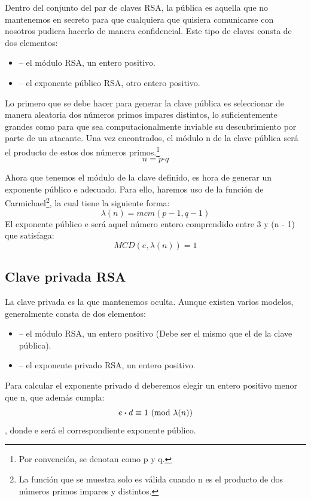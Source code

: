 Dentro del conjunto del par de claves RSA, la pública es aquella que no mantenemos en secreto para que cualquiera que quisiera comunicarse con nosotros pudiera hacerlo de manera confidencial. Este tipo de claves consta de dos elementos:
\begin{itemize}
  \item {} -- el módulo RSA, un entero positivo.
  \item {} -- el exponente público RSA, otro entero positivo.
\end{itemize}

Lo primero que se debe hacer para generar la clave pública es seleccionar de manera aleatoria dos números primos impares distintos, lo suficientemente grandes como para que sea computacionalmente inviable su descubrimiento por parte de un atacante. Una vez encontrados, el módulo n de la clave pública será el producto de estos dos números primos.\footnote{Por convención, se denotan como p y q.}
\[ n = p \boldsymbol{\cdot} q \]

Ahora que tenemos el módulo de la clave definido, es hora de generar un exponente público e adecuado. Para ello, haremos uso de la función de Carmichael\footnote{La función que se muestra solo es válida cuando n es el producto de dos números primos impares y distintos.}, la cual tiene la siguiente forma:
\[ \lambda(n) = mcm(p - 1, q - 1) \]
El exponente público e será aquel número entero comprendido entre 3 y (n - 1) que satisfaga:
\[ MCD(e, \lambda(n)) = 1 \] \emph{\parencite{Reference10}}

\subsection{Clave privada RSA}

La clave privada es la que mantenemos oculta. Aunque existen varios modelos, generalmente consta de dos elementos:
\begin{itemize}
  \item {} -- el módulo RSA, un entero positivo (Debe ser el mismo que el de la clave pública).
  \item {} -- el exponente privado RSA, un entero positivo.
\end{itemize}

Para calcular el exponente privado d deberemos elegir un entero positivo menor que n, que además cumpla:
\[ e \boldsymbol{\cdot} d \equiv 1 \ (\mathrm{mod}\ \lambda(n)) \]
, donde e será el correspondiente exponente público. \emph{\parencite{Reference11}}

